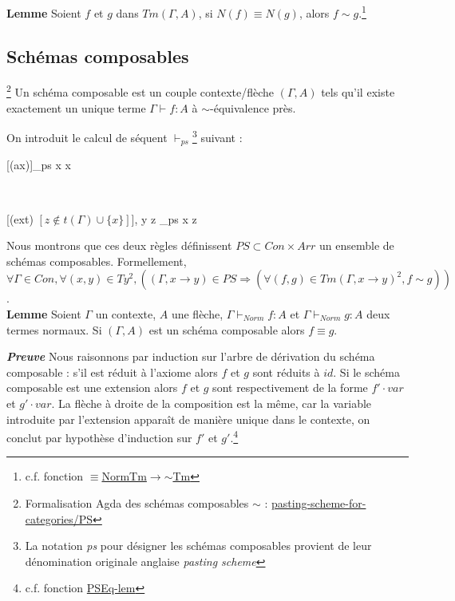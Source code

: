 \documentclass[conference]{IEEEtran}
\begin{document}
	\textbf{Lemme} Soient $f$ et $g$ dans $Tm(\Gamma, A)$, si $N(f) \equiv N(g)$, alors $f \sim g$.\footnote{c.f. fonction \href{https://github.com/ehouget/L3-ENS-Internship/blob/main/pasting-scheme-for-categories/NormTm/Properties.agda}{$\equiv$NormTm$\rightarrow$$\sim$Tm}}
	
	\subsection{Schémas composables} 
	\footnote{Formalisation Agda des schémas composables $\sim$ : \href{https://github.com/ehouget/L3-ENS-Internship/tree/main/pasting-scheme-for-categories/PS}{pasting-scheme-for-categories/PS}}
	Un schéma composable est un couple contexte/flèche $(\Gamma, A)$ tels qu'il existe exactement un unique terme $\Gamma \vdash f : A$ à $\sim$-équivalence près.
	
	On introduit le calcul de séquent $\vdash_{ps}$\footnote{La notation \textit{ps} pour désigner les schémas composables provient de leur dénomination originale anglaise \textit{pasting scheme}} suivant :
	\begin{center}
		\begin{prooftree}
			[(ax)]{\emptyset \vdash_{ps} x \rightarrow x}
		\end{prooftree} \\
		\vspace{15pt}
		\begin{prooftree}
			\hypo[]{\Gamma \vdash_{ps} x \rightarrow y}
			[(ext) $\left[z \notin t(\Gamma) \cup \{x\}\right]$]{\Gamma , y \rightarrow z \vdash_{ps} x \rightarrow z}
		\end{prooftree}
	\end{center} 
	
	Nous montrons que ces deux règles définissent $PS \subset Con \times Arr$ un ensemble de schémas composables. Formellement, $\forall \Gamma \in Con, \forall (x , y) \in Ty^2, ((\Gamma, x \rightarrow y) \in PS \Rightarrow (\forall (f, g) \in Tm(\Gamma, x \rightarrow y)^2, f \sim g))$. \\
	
	\textbf{Lemme} Soient $\Gamma$ un contexte, $A$ une flèche, $\Gamma \vdash_{Norm} f : A$ et $\Gamma \vdash_{Norm} g : A$ deux termes normaux. Si $(\Gamma, A)$ est un schéma composable alors $f \equiv g$.
	
	\textbf{\textit{Preuve}} Nous raisonnons par induction sur l'arbre de dérivation du schéma composable : s'il est réduit à l'axiome alors $f$ et $g$ sont réduits à $id$. Si le schéma composable est une extension alors $f$ et $g$ sont respectivement de la forme $f' \cdot var$ et $g' \cdot var$. La flèche à droite de la composition est la même, car la variable introduite par l'extension apparaît de manière unique dans le contexte, on conclut par hypothèse d'induction sur $f'$ et $g'$.\footnote{c.f. fonction \href{https://github.com/ehouget/L3-ENS-Internship/blob/main/pasting-scheme-for-categories/PSEq.agda}{\textup{PSEq-lem}}} \\
	
\end{document}

